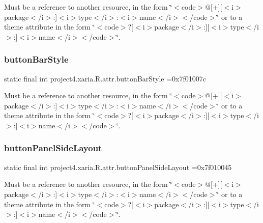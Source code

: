 Must be a reference to another resource, in the form \char`\"{}$<$code$>$@\mbox{[}+\mbox{]}\mbox{[}$<$i$>$package$<$/i$>$\+:\mbox{]}$<$i$>$type$<$/i$>$\+:$<$i$>$name$<$/i$>$$<$/code$>$\char`\"{} or to a theme attribute in the form \char`\"{}$<$code$>$?\mbox{[}$<$i$>$package$<$/i$>$\+:\mbox{]}\mbox{[}$<$i$>$type$<$/i$>$\+:\mbox{]}$<$i$>$name$<$/i$>$$<$/code$>$\char`\"{}. \mbox{\label{classproject4_1_1xaria_1_1R_1_1attr_aa3d266ef99f9cefaee6e57f683ba6e2c}} 
\subsubsection{\texorpdfstring{button\+Bar\+Style}{buttonBarStyle}}
{\footnotesize\ttfamily static final int project4.\+xaria.\+R.\+attr.\+button\+Bar\+Style =0x7f01007c\hspace{0.3cm}{\ttfamily [static]}}

Must be a reference to another resource, in the form \char`\"{}$<$code$>$@\mbox{[}+\mbox{]}\mbox{[}$<$i$>$package$<$/i$>$\+:\mbox{]}$<$i$>$type$<$/i$>$\+:$<$i$>$name$<$/i$>$$<$/code$>$\char`\"{} or to a theme attribute in the form \char`\"{}$<$code$>$?\mbox{[}$<$i$>$package$<$/i$>$\+:\mbox{]}\mbox{[}$<$i$>$type$<$/i$>$\+:\mbox{]}$<$i$>$name$<$/i$>$$<$/code$>$\char`\"{}. \mbox{\label{classproject4_1_1xaria_1_1R_1_1attr_a58666745fb681df1c256d5706f423025}} 
\subsubsection{\texorpdfstring{button\+Panel\+Side\+Layout}{buttonPanelSideLayout}}
{\footnotesize\ttfamily static final int project4.\+xaria.\+R.\+attr.\+button\+Panel\+Side\+Layout =0x7f010045\hspace{0.3cm}{\ttfamily [static]}}

Must be a reference to another resource, in the form \char`\"{}$<$code$>$@\mbox{[}+\mbox{]}\mbox{[}$<$i$>$package$<$/i$>$\+:\mbox{]}$<$i$>$type$<$/i$>$\+:$<$i$>$name$<$/i$>$$<$/code$>$\char`\"{} or to a theme attribute in the form \char`\"{}$<$code$>$?\mbox{[}$<$i$>$package$<$/i$>$\+:\mbox{]}\mbox{[}$<$i$>$type$<$/i$>$\+:\mbox{]}$<$i$>$name$<$/i$>$$<$/code$>$\char`\"{}. \mbox{\label{classproject4_1_1xaria_1_1R_1_1attr_aa307580c654f813f1b53ced93e899f0d}} 
